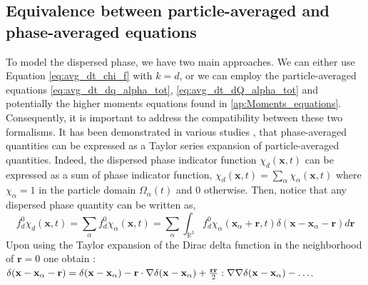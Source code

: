 
\subsection{Equivalence between particle-averaged and phase-averaged equations}
\label{sec:equivalence}
To model the dispersed phase, we have two main approaches. 
We can either use Equation \ref{eq:avg_dt_chi_f} with $k=d$, or we can employ the particle-averaged equations \ref{eq:avg_dt_dq_alpha_tot}, \ref{eq:avg_dt_dQ_alpha_tot} and potentially the higher moments equations found in \ref{ap:Moments_equations}.
Consequently, it is important to address the compatibility between these two formalisms.
It has been demonstrated in various studies \citep{lhuillier1992ensemble,jackson1997locally,zhang1994averaged}, that phase-averaged quantities can be expressed as a Taylor series expansion of particle-averaged quantities. 
Indeed, the dispersed phase indicator function $\chi_d(\textbf{x},t)$ can be expressed as a sum of phase indicator function, $\chi_d(\textbf{x},t) = \sum_\alpha\chi_\alpha(\textbf{x},t)$ where $\chi_\alpha =1$ in the particle domain $\Omega_\alpha(t)$ and $0$ otherwise. 
Then, notice that any dispersed phase quantity can be written as, 
\begin{equation*}
    f^0_d \chi_d(\textbf{x},t)
    = \sum_\alpha f^0_d \chi_\alpha(\textbf{x},t) 
    = \sum_\alpha \int_{\mathbb{R}^3} f^0_d \chi_\alpha(\textbf{x}_\alpha+\textbf{r},t)\delta(\textbf{x}- \textbf{x}_\alpha - \textbf{r}) d\textbf{r} 
    \label{eq:taylor_f_d}
\end{equation*}
Upon using the Taylor expansion of the Dirac delta function in the neighborhood of $\textbf{r}=0$ one obtain :  $\delta(\textbf{x}- \textbf{x}_\alpha - \textbf{r}) = \delta(\textbf{x}- \textbf{x}_\alpha) - \textbf{r}\cdot\mathbf{\nabla} \delta(\textbf{x} - \textbf{x}_\alpha) + \frac{\textbf{rr}}{2}:\mathbf{\nabla}\mathbf{\nabla}\delta(\textbf{x}- \textbf{x}_\alpha) - \ldots $.
